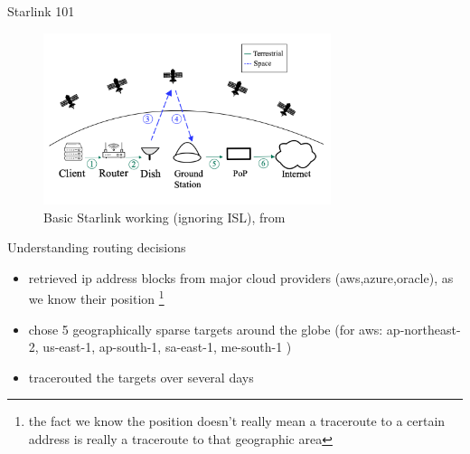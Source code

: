 \documentclass[NET,english,beameralt]{tumbeamer}
\begin{document}

\begin{frame}{Starlink 101}
\begin{figure}
    \includegraphics[width=0.75\textwidth]{pics/starlink-101.png}
    \caption[short]{Basic Starlink working (ignoring ISL), from \cite{izhikevich2023democratizing}}
\end{figure}
\end{frame}

\begin{frame}{Understanding routing decisions}
\begin{itemize}
    \item retrieved ip address blocks from major cloud providers (aws,azure,oracle), as we know their position \footnote[]{the fact we know the position doesn't really mean a traceroute to a certain address is really a traceroute to that geographic area}
    \item chose 5 geographically sparse targets around the globe (for aws: ap-northeast-2, us-east-1, ap-south-1, sa-east-1, me-south-1 )
    \item tracerouted the targets over several days 
\end{itemize}
\end{frame}
\end{document}
